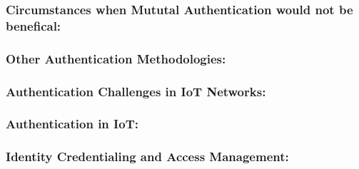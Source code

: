 \documentclass[lnicst,sechang,a4paper]{svmultln}
\begin{document}
\subsubsection{Circumstances when Mututal Authentication would not be benefical:}
\subsubsection{Other Authentication Methodologies:}
\subsubsection{Authentication Challenges in IoT Networks:}
\subsubsection{Authentication in IoT:}
\subsubsection{Identity Credentialing and Access Management:}

\begin{thebibliography}{4}






\end{thebibliography}
\end{document}
